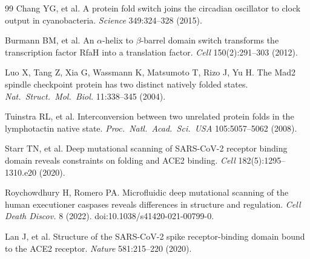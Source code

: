 \documentclass[11pt]{article}
\begin{document}
\begin{thebibliography}{99}
Chang YG, et al. A protein fold switch joins the circadian oscillator to
clock output in cyanobacteria. \emph{Science} 349:324--328 (2015).

Burmann BM, et al. An $\alpha$-helix to $\beta$-barrel domain switch
transforms the transcription factor RfaH into a translation factor.
\emph{Cell} 150(2):291--303 (2012).

Luo X, Tang Z, Xia G, Wassmann K, Matsumoto T, Rizo J, Yu H. The Mad2
spindle checkpoint protein has two distinct natively folded states.
\emph{Nat.\ Struct.\ Mol.\ Biol.} 11:338--345 (2004).

Tuinstra RL, et al. Interconversion between two unrelated protein folds in
the lymphotactin native state. \emph{Proc.\ Natl.\ Acad.\ Sci.\ USA}
105:5057--5062 (2008).

Starr TN, et al. Deep mutational scanning of SARS-CoV-2 receptor binding
domain reveals constraints on folding and ACE2 binding. \emph{Cell}
182(5):1295--1310.e20 (2020).

Roychowdhury H, Romero PA. Microfluidic deep mutational scanning of the
human executioner caspases reveals differences in structure and regulation.
\emph{Cell Death Discov.} 8 (2022). doi:10.1038/s41420-021-00799-0.

Lan J, et al. Structure of the SARS-CoV-2 spike receptor-binding domain
bound to the ACE2 receptor. \emph{Nature} 581:215--220 (2020).

\end{thebibliography}

\clearpage
\end{document}
